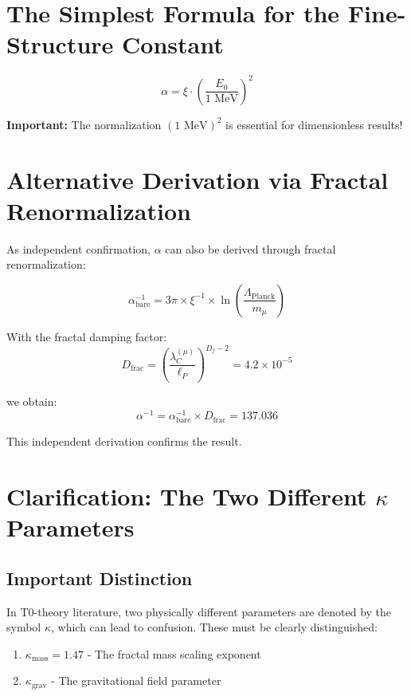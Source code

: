 \documentclass[12pt,a4paper]{report}
\begin{document}
\section*{The Simplest Formula for the Fine-Structure Constant}

\[
\boxed{\alpha = \xi \cdot \left(\frac{E_0}{1 \text{ MeV}}\right)^2}
\]
\begin{tcolorbox}[colback=red!5!white,colframe=red!75!black]
	\textbf{Important:} The normalization $(1 \text{ MeV})^2$ is essential for dimensionless results!
\end{tcolorbox}	
	\section{Alternative Derivation via Fractal Renormalization}
	
	As independent confirmation, $\alpha$ can also be derived through fractal renormalization:
	
	\begin{equation}
		\alpha_{\text{bare}}^{-1} = 3\pi \times \xi^{-1} \times \ln\left(\frac{\Lambda_{\text{Planck}}}{m_\mu}\right)
	\end{equation}
	
	With the fractal damping factor:
	\begin{equation}
		D_{\text{frac}} = \left(\frac{\lambda_C^{(\mu)}}{\ell_P}\right)^{D_f-2} = 4.2 \times 10^{-5}
	\end{equation}
	
	we obtain:
	\begin{equation}
		\alpha^{-1} = \alpha_{\text{bare}}^{-1} \times D_{\text{frac}} = 137.036
	\end{equation}
	
	This independent derivation confirms the result.
	
	\section{Clarification: The Two Different $\kappa$ Parameters}
	
	\subsection{Important Distinction}
	
	In T0-theory literature, two physically different parameters are denoted by the symbol $\kappa$, which can lead to confusion. These must be clearly distinguished:
	
	\begin{enumerate}
		\item $\kappa_{\text{mass}} = 1.47$ - The fractal mass scaling exponent
		\item $\kappa_{\text{grav}}$ - The gravitational field parameter
	\end{enumerate}
	
\end{document}
